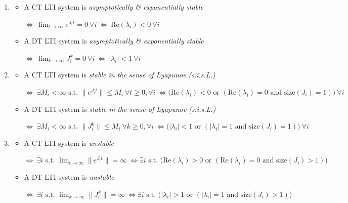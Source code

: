 \documentclass[twoside, 11pt]{article}
\begin{document}
\begin{enumerate}
\item 
\begin{itemize}
\item A CT LTI system is \textit{asymptotically \& exponentially stable} 

$\iff \ \lim_{t \to \infty } e^{J_i t} = 0 \ \forall i \ \iff \ \mathrm{Re}(\lambda_i) < 0 \ \forall i$  
\item A DT LTI system is \textit{asymptotically \& exponentially stable} 

$\iff \ \lim_{k \to \infty } J_i^k = 0 \ \forall i \ \iff \ |\lambda_i| < 1 \ \forall i$  
\end{itemize}
%
\item 
\begin{itemize}
\item A CT LTI system is \textit{stable in the sense of Lyapunov (s.i.s.L.)} 

$\iff \ \exists M_i < \infty \text{ s.t. } \|e^{J_i t}\| \leq M_i \ \forall t \geq 0, \forall i \ \iff \big( \mathrm{Re}(\lambda_i) < 0 \text{ or } ( \mathrm{Re}(\lambda_i) = 0 \text{ and } \text{size}(J_i) = 1 ) \big) \ \forall i$  
%
\item A DT LTI system is \textit{stable in the sense of Lyapunov (s.i.s.L.)} 

$\iff \ \exists M_i < \infty \text{ s.t. } \|J_i^k\| \leq M_i \ \forall k \geq 0, \forall i \ \iff \big( |\lambda_i| < 1 \text{ or } ( |\lambda_i| = 1 \text{ and } \text{size}(J_i) = 1 ) \big) \ \forall i$  
\end{itemize}

\item 
\begin{itemize}
\item A CT LTI system is \textit{unstable}

$\iff \ \exists i \text{ s.t. } \lim_{t \to \infty } \|e^{J_i t}\| = \infty \ \iff \exists i \text{ s.t. } \big( \mathrm{Re}(\lambda_i) > 0 \text{ or } ( \mathrm{Re}(\lambda_i) = 0 \text{ and } \text{size}(J_i) > 1 ) \big)$  
%
\item A DT LTI system is \textit{unstable} 

$\iff \ \exists i \text{ s.t. } \lim_{k \to \infty } \|J_i^k\| = \infty \ \iff \exists i \text{ s.t. } \big( |\lambda_i| > 1 \text{ or } ( |\lambda_i| = 1 \text{ and } \text{size}(J_i) > 1 ) \big)$  
\end{itemize}

\end{enumerate}
\end{document}
